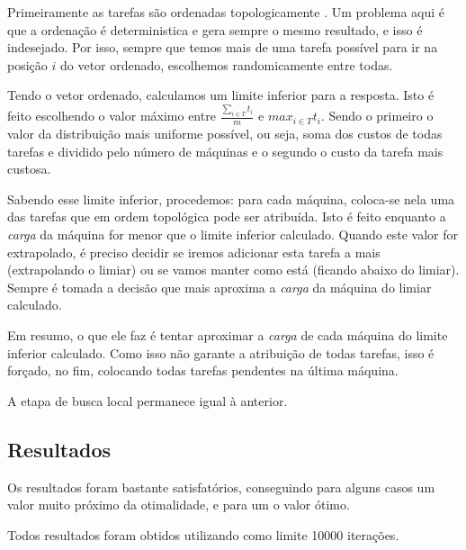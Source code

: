 \documentclass{report}
\begin{document}
{Primeiramente as tarefas são ordenadas topologicamente \cite{top}.
Um problema aqui é que a ordenação é deterministica e gera
sempre o mesmo resultado, e isso é indesejado. Por isso, sempre que temos mais
de uma tarefa possível para ir na
posição $i$ do vetor ordenado, escolhemos randomicamente entre todas.

Tendo o vetor ordenado, calculamos um limite inferior para a
resposta. Isto é feito escolhendo o valor máximo entre $\frac{\sum_{i\in T}t_i}{m}$
 e $max_{i\in T}t_i$. Sendo o primeiro
o valor da distribuição mais uniforme possível, ou seja,
soma dos custos de todas tarefas e dividido pelo
número de máquinas e o segundo o custo da tarefa mais custosa.

Sabendo esse limite inferior, procedemos: para cada máquina, coloca-se
nela uma das tarefas que em ordem topológica pode ser atribuída.
Isto é feito enquanto a \emph{carga}
da máquina for menor que o limite inferior
calculado. Quando este valor for extrapolado, é preciso decidir se iremos
adicionar esta tarefa a mais
(extrapolando o limiar) ou se vamos manter como está (ficando abaixo do limiar).
Sempre é tomada a decisão que mais
aproxima a \emph{carga} da máquina do limiar calculado.

Em resumo, o que ele faz é tentar aproximar a \emph{carga} de
cada máquina do limite inferior calculado.
Como isso não garante a atribuição de todas tarefas, isso é forçado, no fim,
colocando todas tarefas pendentes na última máquina.

A etapa de busca local permanece igual à anterior.

\subsection{Resultados}

Os resultados foram bastante satisfatórios, conseguindo para alguns casos um
valor muito próximo da otimalidade, e para um o valor ótimo.

Todos resultados foram obtidos utilizando como limite 10000 iterações.

}
\end{document}
